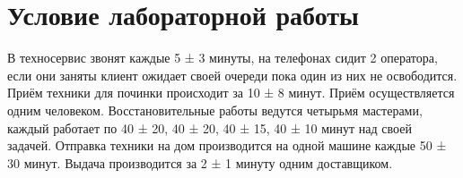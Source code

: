 \section{Условие лабораторной работы}

В техносервис звонят каждые 5 ± 3 минуты, на телефонах сидит 2 оператора, если они заняты клиент ожидает своей очереди пока один из них не освободится. 
Приём техники для починки происходит за 10 ± 8 минут. Приём осуществляется одним человеком. Восстановительные работы ведутся четырьмя мастерами, каждый работает по 40 ± 20, 40 ± 20, 40 ± 15, 40 ± 10 минут над своей задачей. 
Отправка техники на дом производится на одной машине каждые 50 ± 30 минут. 
Выдача производится за 2 ± 1 минуту одним
доставщиком.